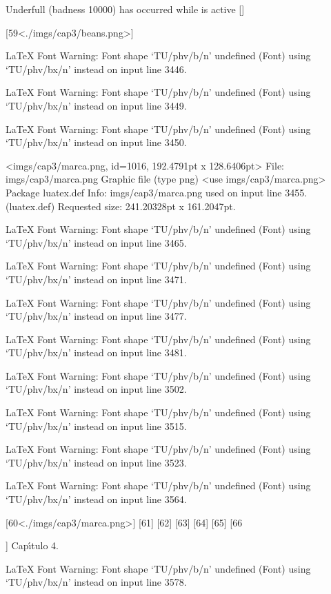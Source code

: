 Underfull \vbox (badness 10000) has occurred while \output is active []

[59<./imgs/cap3/beans.png>]

LaTeX Font Warning: Font shape `TU/phv/b/n' undefined
(Font)              using `TU/phv/bx/n' instead on input line 3446.


LaTeX Font Warning: Font shape `TU/phv/b/n' undefined
(Font)              using `TU/phv/bx/n' instead on input line 3449.


LaTeX Font Warning: Font shape `TU/phv/b/n' undefined
(Font)              using `TU/phv/bx/n' instead on input line 3450.

<imgs/cap3/marca.png, id=1016, 192.4791pt x 128.6406pt>
File: imgs/cap3/marca.png Graphic file (type png)
<use imgs/cap3/marca.png>
Package luatex.def Info: imgs/cap3/marca.png  used on input line 3455.
(luatex.def)             Requested size: 241.20328pt x 161.2047pt.

LaTeX Font Warning: Font shape `TU/phv/b/n' undefined
(Font)              using `TU/phv/bx/n' instead on input line 3465.


LaTeX Font Warning: Font shape `TU/phv/b/n' undefined
(Font)              using `TU/phv/bx/n' instead on input line 3471.


LaTeX Font Warning: Font shape `TU/phv/b/n' undefined
(Font)              using `TU/phv/bx/n' instead on input line 3477.


LaTeX Font Warning: Font shape `TU/phv/b/n' undefined
(Font)              using `TU/phv/bx/n' instead on input line 3481.


LaTeX Font Warning: Font shape `TU/phv/b/n' undefined
(Font)              using `TU/phv/bx/n' instead on input line 3502.


LaTeX Font Warning: Font shape `TU/phv/b/n' undefined
(Font)              using `TU/phv/bx/n' instead on input line 3515.


LaTeX Font Warning: Font shape `TU/phv/b/n' undefined
(Font)              using `TU/phv/bx/n' instead on input line 3523.


LaTeX Font Warning: Font shape `TU/phv/b/n' undefined
(Font)              using `TU/phv/bx/n' instead on input line 3564.

[60<./imgs/cap3/marca.png>] [61] [62] [63] [64] [65] [66

]
Cap\'{\i }tulo 4.

LaTeX Font Warning: Font shape `TU/phv/b/n' undefined
(Font)              using `TU/phv/bx/n' instead on input line 3578.

